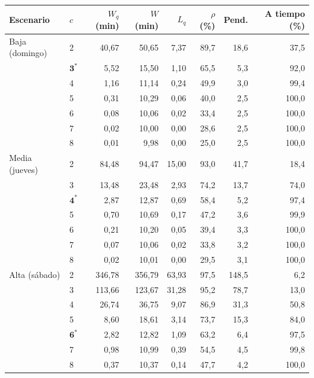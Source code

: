 {\small
\begin{tabular}{llrrrrrr}
\toprule
Escenario & $c$ & $W_q$ (min) & $W$ (min) & $L_q$ & $\rho$ (\%) & Pend. & A tiempo (\%) \\
\midrule
Baja (domingo) & 2 & 40,67 & 50,65 & 7,37 & 89,7 & 18,6 & 37,5 \\
 & $\mathbf{3^*}$ & 5,52 & 15,50 & 1,10 & 65,5 & 5,3 & 92,0 \\
 & 4 & 1,16 & 11,14 & 0,24 & 49,9 & 3,0 & 99,4 \\
 & 5 & 0,31 & 10,29 & 0,06 & 40,0 & 2,5 & 100,0 \\
 & 6 & 0,08 & 10,06 & 0,02 & 33,4 & 2,5 & 100,0 \\
 & 7 & 0,02 & 10,00 & 0,00 & 28,6 & 2,5 & 100,0 \\
 & 8 & 0,01 & 9,98 & 0,00 & 25,0 & 2,5 & 100,0 \\
\midrule
Media (jueves) & 2 & 84,48 & 94,47 & 15,00 & 93,0 & 41,7 & 18,4 \\
 & 3 & 13,48 & 23,48 & 2,93 & 74,2 & 13,7 & 74,0 \\
 & $\mathbf{4^*}$ & 2,87 & 12,87 & 0,69 & 58,4 & 5,2 & 97,4 \\
 & 5 & 0,70 & 10,69 & 0,17 & 47,2 & 3,6 & 99,9 \\
 & 6 & 0,21 & 10,20 & 0,05 & 39,4 & 3,3 & 100,0 \\
 & 7 & 0,07 & 10,06 & 0,02 & 33,8 & 3,2 & 100,0 \\
 & 8 & 0,02 & 10,01 & 0,00 & 29,5 & 3,1 & 100,0 \\
\midrule
Alta (sábado) & 2 & 346,78 & 356,79 & 63,93 & 97,5 & 148,5 & 6,2 \\
 & 3 & 113,66 & 123,67 & 31,28 & 95,2 & 78,7 & 13,0 \\
 & 4 & 26,74 & 36,75 & 9,07 & 86,9 & 31,3 & 50,8 \\
 & 5 & 8,60 & 18,61 & 3,14 & 73,7 & 15,3 & 84,0 \\
 & $\mathbf{6^*}$ & 2,82 & 12,82 & 1,09 & 63,2 & 6,4 & 97,5 \\
 & 7 & 0,98 & 10,99 & 0,39 & 54,5 & 4,5 & 99,8 \\
 & 8 & 0,37 & 10,37 & 0,14 & 47,7 & 4,2 & 100,0 \\
\bottomrule
\end{tabular}}
